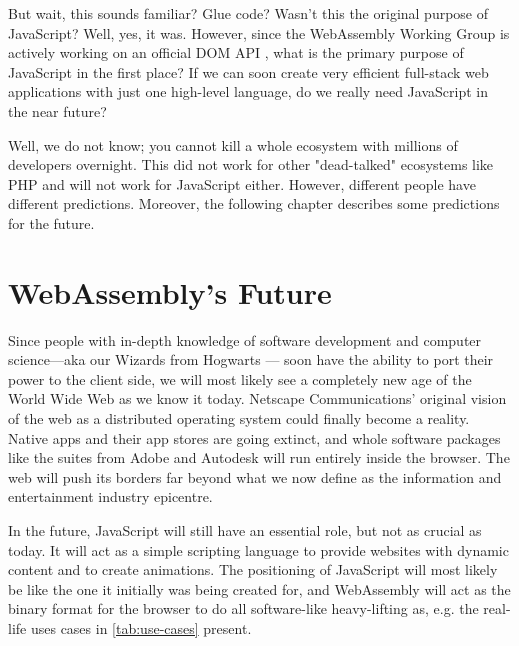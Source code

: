 \documentclass[10pt]{article}
\begin{document}
\begin{sloppypar}
  But wait, this sounds familiar? Glue code? Wasn’t this the original purpose of JavaScript? Well, yes, it was. However, since the WebAssembly Working Group is actively working on an official DOM API \citep{mozilla_webassemblymodule_2023}, what is the primary purpose of JavaScript in the first place? If we can soon create very efficient full-stack web applications with just one high-level language, do we really need JavaScript in the near future?

  Well, we do not know; you cannot kill a whole ecosystem with millions of developers overnight. This did not work for other "dead-talked" ecosystems like PHP and will not work for JavaScript either. However, different people have different predictions. Moreover, the following chapter describes some predictions for the future.

  \section{WebAssembly's Future}
  \label{sec:webassembly-future}

  Since people with in-depth knowledge of software development and computer science—aka our Wizards from Hogwarts — soon have the ability to port their power to the client side, we will most likely see a completely new age of the World Wide Web as we know it today. Netscape Communications’ original vision of the web as a distributed operating system could finally become a reality. Native apps and their app stores are going extinct, and whole software packages like the suites from Adobe and Autodesk will run entirely inside the browser. The web will push its borders far beyond what we now define as the information and entertainment industry epicentre.

  In the future, JavaScript will still have an essential role, but not as crucial as today. It will act as a simple scripting language to provide websites with dynamic content and to create animations. The positioning of JavaScript will most likely be like the one it initially was being created for, and WebAssembly will act as the binary format for the browser to do all software-like heavy-lifting as, e.g. the real-life uses cases in \autoref{tab:use-cases} present.


\end{sloppypar}
\end{document}
